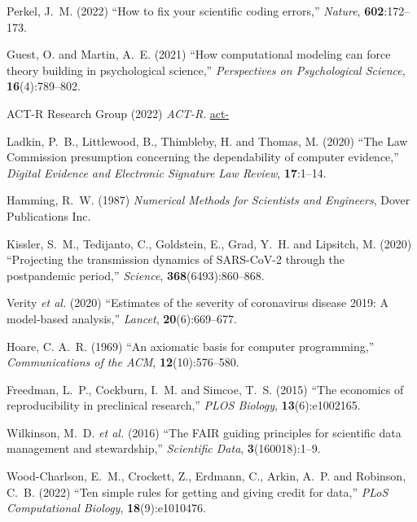 \documentclass{comjnl}
\begin{document}
{\begin{thebibliography}{100}
{{
Perkel, J.~M. (2022) ``How to fix your scientific coding errors,'' {\em
  Nature}, \textbf{602}:172--173.
\newblock {}

Guest, O. and Martin, A.~E. (2021) ``How computational modeling can force
  theory building in psychological science,'' {\em Perspectives on
  Psychological Science}, \textbf{16}(4):789--802.
\newblock {}

{ACT-R Research Group} (2022) {\em {ACT-R}}.
\newblock \url{act-}

Ladkin, P.~B., Littlewood, B., Thimbleby, H. and Thomas, M. (2020) ``The {Law
  Commission} presumption concerning the dependability of computer evidence,''
  {\em Digital Evidence and Electronic Signature Law Review},
  \textbf{17}:1--14.
\newblock {}

Hamming, R.~W. (1987) {\em Numerical Methods for Scientists and Engineers},
  Dover Publications Inc.

Kissler, S.~M., Tedijanto, C., Goldstein, E., Grad, Y.~H. and Lipsitch, M.
  (2020) ``Projecting the transmission dynamics of {SARS-CoV-2} through the
  postpandemic period,'' {\em Science}, \textbf{368}(6493):860--868.
\newblock {}

Verity \emph{et al.} (2020) ``Estimates of the severity of coronavirus disease
  2019: {A} model-based analysis,'' {\em Lancet}, \textbf{20}(6):669--677.
\newblock {}

Hoare, C. A.~R. (1969) ``An axiomatic basis for computer programming,'' {\em
  Communications of the ACM}, \textbf{12}(10):576--580.
\newblock {}

Freedman, L.~P., Cockburn, I.~M. and Simcoe, T.~S. (2015) ``The economics of
  reproducibility in preclinical research,'' {\em PLOS Biology},
  \textbf{13}(6):e1002165.
\newblock {}

Wilkinson, M.~D. \emph{et al.} (2016) ``The {FAIR} guiding principles for
  scientific data management and stewardship,'' {\em Scientific Data},
  \textbf{3}(160018):1--9.
\newblock {}

Wood-Charlson, E.~M., Crockett, Z., Erdmann, C., Arkin, A.~P. and Robinson,
  C.~B. (2022) ``Ten simple rules for getting and giving credit for data,''
  {\em PLoS Computational Biology}, \textbf{18}(9):e1010476.
\newblock {}

}}
\end{thebibliography}}
\end{document}
